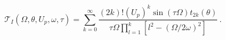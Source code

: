 \begin{equation}
\mathcal{T}_{I}(\Omega ,\theta ,U_{p},\omega ,\tau )=\sum_{k=0}^{\infty }%
\frac{(2k)!(U_{p})^{k}\sin (\tau \Omega )t_{2k}(\theta )}{\tau \Omega
\prod_{l=1}^{k}[l^{2}-(\Omega /2\omega )^{2}]}\,.  \label{ts}
\end{equation}

